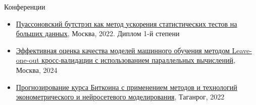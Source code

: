 \documentclass{resume}  %
\begin{document}

\begin{rSection}{Конференции}
   \begin{itemize}
      \itemsep -5pt {}
      \item \href{https://elibrary.ru/ipezcy}{Пуассоновский бутстрэп как метод ускорения статистических тестов на больших данных}, Москва, 2022. Диплом 1-й степени
      \item \href{https://elibrary.ru/zawqgj}{Эффективная оценка качества моделей машинного обучения методом Leave-one-out кросс-валидации с использованием параллельных вычислений}, Москва, 2024
      \item \href{https://elibrary.ru/qnqsgi}{Прогнозирование курса Биткоина с применением методов и технологий эконометрического и нейросетевого моделирования}, Таганрог, 2022
   \end{itemize}
\end{rSection}
\end{document}

